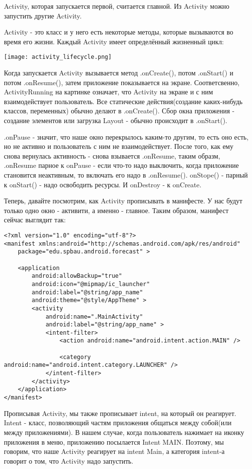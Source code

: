 \documentclass[12 pt]{article}
\begin{document}
    Activity, которая запускается первой, считается главной. Из Activity можно запустить другие Activity.

    Activity - это класс и у него есть некоторые методы, которые вызываются во время его жизни. Каждый Activity имеет определённый жизненный цикл:

	\texttt{[image: activity\_lifecycle.png]}
	
	Когда запускается Activity вызывается метод .onCreate(), потом .onStart() и потом .onResume(), затем приложение показывается на экране. Соответсвенно, ActivityRunning на картинке означает, что Activity на экране и с ним взаимодействует пользователь. Все статические действия(создание каких-нибудь классов, переменных) обычно делают в .onCreate(). Сбор окна приложения - создание элементов или загрузка Layout - обычно происходит в .onStart().
	
	.onPause - значит, что наше окно перекрылось каким-то другим, то есть оно есть, но не активно и пользователь с ним не взаимодействует. После того, как ему снова вернулась активность - снова взывается .onResume, таким образм, .onResume парное к onPause - если что-то надо выключить, когда приложение становится неактивным, то включать его надо в .onResume(). onStope() - парный к onStart() - надо освободить ресурсы. И onDestroy - к onCreate.
	
	Теперь, давайте посмотрим, как Activity прописывать в манифесте. У нас будут только одно окно - активити, а именно - главное. Таким образом, манифест сейчас выглядит так:
	
	\begin{lstlisting}
<?xml version="1.0" encoding="utf-8"?>
<manifest xmlns:android="http://schemas.android.com/apk/res/android"
    package="edu.spbau.android.forecast" >

    <application
        android:allowBackup="true"
        android:icon="@mipmap/ic_launcher"
        android:label="@string/app_name"
        android:theme="@style/AppTheme" >
        <activity
            android:name=".MainActivity"
            android:label="@string/app_name" >
            <intent-filter>
                <action android:name="android.intent.action.MAIN" />

                <category android:name="android.intent.category.LAUNCHER" />
            </intent-filter>
        </activity>    
    </application>
</manifest>
    \end{lstlisting}
    
    Прописывая Activity, мы также прописывает intent, на который он реагирует. Intent - класс, позволяющий частям приложения общаться между собой(или между приложениями). В нашем случае, когда пользователь нажимает на иконку приложения в меню, приложению посылается Intent MAIN. Поэтому, мы говорим, что наше Activity реагирует на intent Main, а категория intent-а говорит о том, что Activity надо запустить.
    
\end{document}
